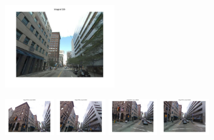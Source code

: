     \begin{figure}[h]
        \begin{minipage}{1.0\linewidth}
        \end{minipage}
        \begin{minipage}{0.34\linewidth}
            \centering
            \vspace{0mm}
            \includegraphics[trim = 45mm 40mm 45mm 30mm, clip=true,height=36mm]{imgs/Pval/exImproved02/query.jpg}
        \end{minipage}
        \begin{minipage}{0.75\linewidth}
            \begin{minipage}{\linewidth} 
                \colorbox{myGreen}{\includegraphics[trim = 35mm 30mm 35mm 30mm, clip=true, height=16mm]{imgs/Pval/exImproved02/improvedPval01.jpg}}
                \colorbox{myGreen}{\includegraphics[trim = 35mm 30mm 35mm 30mm, clip=true, height=16mm]{imgs/Pval/exImproved02/improvedPval02.jpg}}
                \colorbox{myGreen}{\includegraphics[trim = 35mm 30mm 35mm 30mm, clip=true, height=16mm]{imgs/Pval/exImproved02/improvedPval03.jpg}}
                \colorbox{myGreen}{\includegraphics[trim = 35mm 30mm 35mm 30mm, clip=true, height=16mm]{imgs/Pval/exImproved02/improvedPval04.jpg}}

\end{minipage}
\end{minipage}
\end{figure}
